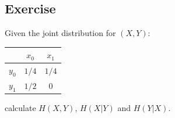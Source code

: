 \documentclass[12pt]{article}
\begin{document}
\subsection*{Exercise}
Given the joint distribution for $(X,Y)$:
\begin{center}
\begin{tabular}{c|cc}
&$x_0$&$x_1$\\
\hline
$y_0$&$1/4$&$1/4$\\
$y_1$&$1/2$&$0$
\end{tabular}
\end{center}
calculate $H(X,Y)$, $H(X|Y)$ and $H(Y|X)$.


{}
\end{document}
